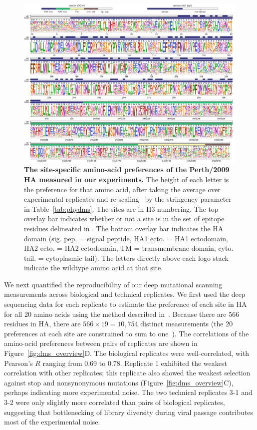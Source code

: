 \documentclass[9pt,twocolumn,twoside]{pnas-new}
\begin{document}
\begin{figure}[ht]
\centering
\includegraphics[width=17cm]{figs/prefslogoplot/rescaled-avgprefs_prefs.pdf}
\caption{\label{fig:logoplot}
{\bf The site-specific amino-acid preferences of the Perth/2009 HA measured in our experiments.}
The height of each letter is the preference for that amino acid, after taking the average over experimental replicates and re-scaling~\cite{hilton2017phydms} by the stringency parameter in Table~\ref{tab:phydms}.
The sites are in H3 numbering.
The top overlay bar indicates whether or not a site is in the set of epitope residues delineated in \cite{wolf2006long}.
The bottom overlay bar indicates the HA domain (sig. pep. = signal peptide, HA1 ecto. = HA1 ectodomain, HA2 ecto. = HA2 ectodomain, TM = transmembrane domain, cyto. tail. = cytoplasmic tail).
The letters directly above each logo stack indicate the wildtype amino acid at that site.
}
\end{figure}

We next quantified the reproducibility of our deep mutational scanning measurements across biological and technical replicates.
We first used the deep sequencing data for each replicate to estimate the preference of each site in HA for all 20 amino acids using the method described in~\cite{bloom2015software}.
Because there are 566 residues in HA, there are $566 \times 19 = 10,754$ distinct measurements (the 20 preferences at each site are constrained to sum to one~\cite{bloom2015software}).
The correlations of the amino-acid preferences between pairs of replicates are shown in Figure~\ref{fig:dms_overview}D.
The biological replicates were well-correlated, with Pearson's $R$ ranging from 0.69 to 0.78.
Replicate 1 exhibited the weakest correlation with other replicates; this replicate also showed the weakest selection against stop and nonsynonymous mutations (Figure~\ref{fig:dms_overview}C), perhaps indicating more experimental noise.
The two technical replicates 3-1 and 3-2 were only slightly more correlated than pairs of biological replicates, suggesting that bottlenecking of library diversity during viral passage contributes most of the experimental noise.
\end{document}
